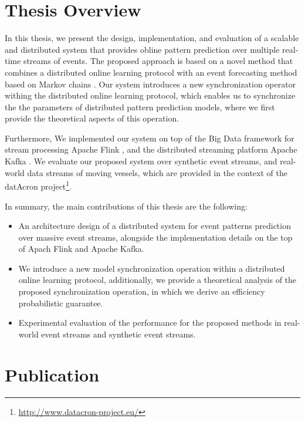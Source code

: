 \section{Thesis Overview}
\par In this thesis, we present the design, implementation, and evaluation of a scalable and distributed system that provides obline pattern prediction over multiple real-time streams of events. The proposed approach is based on a novel method that combines a distributed online learning protocol \cite{dekel2012optimal,kamp2014communication} with an event forecasting method based on Markov chains \cite{alevizos2017event}. Our system introduces a new synchronization operator withing the distributed online learning protocol, which enables us to synchronize the the parameters of distributed pattern prediction models, where we first provide the theoretical aspects of this operation.

Furthermore, We implemented our system on top of the Big Data framework for stream processing Apache Flink \cite{Flink}, and the distributed streaming platform Apache Kafka \cite{Kafka}. We evaluate our proposed system over synthetic event streams, and real-world data streams of moving vessels, which are provided in the context of the datAcron project\footnote{\url{http://www.datacron-project.eu/}}.

In summary, the main contributions of this thesis are the following:

\begin{itemize}
	\item An architecture design of a distributed system for  event patterns prediction over massive event streams, alongside the implementation details on the top of Apach Flink and Apache Kafka.  
	\item We introduce a new model synchronization operation within a distributed online learning protocol, additionally,  we provide a theoretical analysis of the proposed synchronization operation, in which we derive an  efficiency probabilistic guarantee. 
	\item Experimental evaluation of the performance for the proposed methods in real- world  event streams and synthetic event streams.
  
\end{itemize}


\section{Publication}

